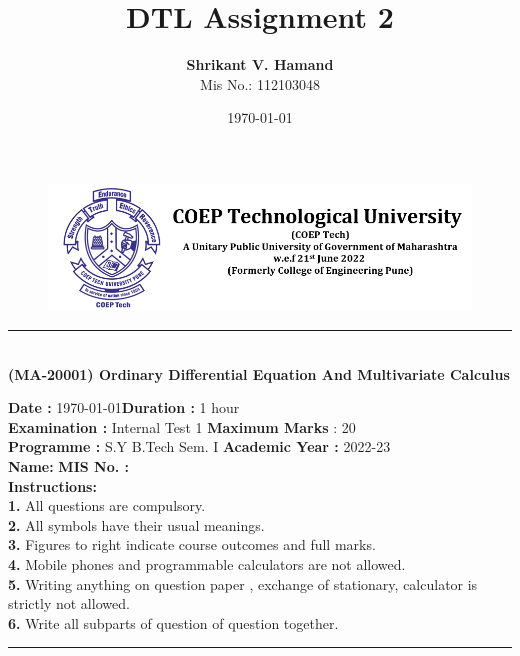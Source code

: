 \documentclass[12pt]{article}
\title{\huge \textbf{DTL Assignment 2}}
\author{\textbf{Shrikant V. Hamand}\\[10pt] Mis No.: 112103048}
\date{\today}
\begin{document}
\maketitle
{}
\newpage
{}
\vspace{10mm}
\begin{center}

\begin{figure}
\includegraphics[scale=0.8]{coep_new_logo}
\end{figure}
\par\noindent\rule{\textwidth}{1pt}
\\
\vspace{6mm}
\large \textbf{(MA-20001) Ordinary Differential Equation And Multivariate Calculus} \\[5pt]  
\end{center}

\vspace{5mm}
\noindent \textbf{Date :} \today \hfill \textbf {Duration :} 1 hour
\\[5pt] \textbf {Examination :} Internal Test 1 \hfill  \textbf {Maximum Marks} : 20
\\[5pt] \textbf {Programme :} S.Y B.Tech Sem. I \hfill \textbf {Academic Year :} 2022-23 
\linebreak
\\ \textbf {Name:} \hfill \textbf{MIS No. : }
\linebreak
\\ \textbf{Instructions:}
\linebreak
\\ \textbf{1.} All questions are compulsory.
\\[5pt] \textbf{2.} All symbols have their usual meanings.
\\[5pt] \textbf{3.} Figures to right indicate course outcomes and full marks.
\\ [5pt]\textbf{4.} Mobile phones and programmable calculators are not allowed.
\\[5pt] \textbf{5.} Writing anything on question paper , exchange of stationary, calculator is strictly not allowed.
\\[5pt] \textbf{6.} Write all subparts of question of question together.
\par\noindent\rule{\textwidth}{1pt}
\\
\newpage
\end{document}
